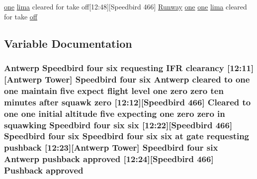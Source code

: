 \begin{DoxyCompactItemize}
\hyperlink{happyDay5ExpectedATC_8txt_a1bdf675837626f29e859d1a241701d26}{one} \hyperlink{happyDay5ExpectedATC_8txt_abc10fad7597c191bcd8586b1cddb7835}{lima} cleared for take off\mbox{[}12\+:48\mbox{]}\mbox{[}Speedbird 466\mbox{]} \hyperlink{classRunway}{Runway} \hyperlink{happyDay5ExpectedATC_8txt_a1bdf675837626f29e859d1a241701d26}{one} \hyperlink{happyDay5ExpectedATC_8txt_a1bdf675837626f29e859d1a241701d26}{one} \hyperlink{happyDay5ExpectedATC_8txt_abc10fad7597c191bcd8586b1cddb7835}{lima} cleared for take \hyperlink{happyDay4ExpectedATC_8txt_a29c691e3d615c36339c8fd5f44a0cff1}{off}
\end{DoxyCompactItemize}


\subsection{Variable Documentation}
\subsubsection[{\texorpdfstring{approved}{approved}}]{\setlength{\rightskip}{0pt plus 5cm}Antwerp Speedbird four {\bf six} requesting I\+FR clearancy \mbox{[}12\+:11\mbox{]}\mbox{[}Antwerp {\bf Tower}\mbox{]} Speedbird four {\bf six} Antwerp cleared to {\bf one} {\bf one} maintain five expect flight level {\bf one} {\bf zero} {\bf zero} {\bf ten} minutes after squawk {\bf zero} \mbox{[}12\+:12\mbox{]}\mbox{[}Speedbird 466\mbox{]} Cleared to {\bf one} {\bf one} initial altitude five expecting {\bf one} {\bf zero} {\bf zero} in {\bf squawking} Speedbird four {\bf six} {\bf six} \mbox{[}12\+:22\mbox{]}\mbox{[}Speedbird 466\mbox{]} Speedbird four {\bf six} Speedbird four {\bf six} {\bf six} at gate requesting pushback \mbox{[}12\+:23\mbox{]}\mbox{[}Antwerp {\bf Tower}\mbox{]} Speedbird four {\bf six} Antwerp pushback approved \mbox{[}12\+:24\mbox{]}\mbox{[}Speedbird 466\mbox{]} Pushback approved}\hypertarget{happyDay4ExpectedATC_8txt_ac858d170c8c9788ee90f1502f4299d18}{}\label{happyDay4ExpectedATC_8txt_ac858d170c8c9788ee90f1502f4299d18}
